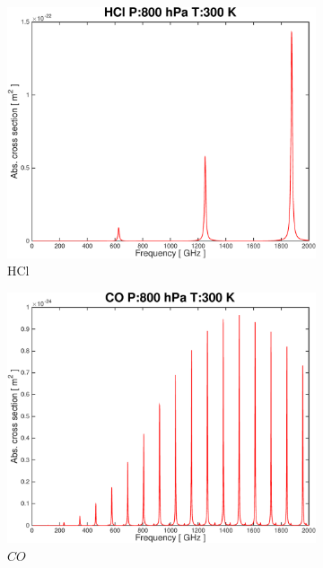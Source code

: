 \documentclass[paper=a4, fontsize=11pt]{scrartcl}
\begin{document}
\begin{figure}[ht]
    \centering
    \begin{subfigure}[t]{0.45\textwidth}
        \includegraphics[width=\textwidth]{plots/plot_xsec_HCl_800hPa_300K.pdf}
        \caption{HCl}
    \end{subfigure}
    \begin{subfigure}[t]{0.45\textwidth}
        \includegraphics[width=\textwidth]{plots/plot_xsec_CO_800hPa_300K.pdf}
        \caption{$CO$}
    \end{subfigure}
    \begin{subfigure}[b]{0.45\textwidth}

\end{subfigure}
\end{figure}
\end{document}
